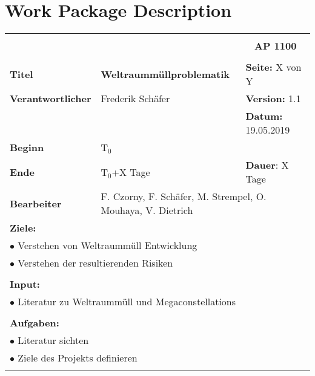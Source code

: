\section{Work Package Description}
\label{sec:wpd}


\begin{table}[!h]
 \begin{center}
  \begin{tabular}{|p{35mm}||p{55mm}|p{50mm}||p{40mm}|}
   \hline
   \multicolumn{3}{|l||}{\textbf{}} & \multicolumn{1}{c|}{}\\
   \multicolumn{3}{|l||}{\textbf{}} & \multicolumn{1}{c|}{\textbf{AP 1100}}\\
   \multicolumn{3}{|l||}{\textbf{}} & \multicolumn{1}{c|}{}\\
   \hline\hline
   \textbf{Titel} & \multicolumn{2}{p{7cm}||}{\textbf{Weltraummüllproblematik}} & \textbf{Seite:} X von Y\\
   \hline
   \textbf{Verantwortlicher} & \multicolumn{2}{l||}{Frederik Schäfer} & \textbf{Version:} 1.1\\
   \hline
   \multicolumn{3}{|l||}{} & \textbf{Datum:} 19.05.2019\\
   \hline\hline
   \textbf{Beginn} & \multicolumn{2}{l||}{T$_0$} & \\
   \hline
   \textbf{Ende} & \multicolumn{2}{l||}{T$_0$+X Tage} & \textbf{Dauer}: X Tage\\
   \hline\hline
   \textbf{Bearbeiter} & \multicolumn{3}{l|}{F. Czorny, F. Schäfer, M. Strempel, O. Mouhaya, V. Dietrich}\\
   \hline\hline
   \multicolumn{4}{|p{150mm}|}{\textbf{Ziele:}}\\
   \multicolumn{4}{|p{150mm}|}{$\bullet$ Verstehen von Weltraummüll Entwicklung}\\
   \multicolumn{4}{|p{150mm}|}{$\bullet$ Verstehen der resultierenden Risiken}\\
   \multicolumn{4}{|p{150mm}|}{}\\
   \multicolumn{4}{|p{150mm}|}{\textbf{Input:}}\\
   \multicolumn{4}{|p{150mm}|}{$\bullet$ Literatur zu Weltraummüll und Megaconstellations}\\
   \multicolumn{4}{|p{150mm}|}{}\\
   \multicolumn{4}{|p{150mm}|}{\textbf{Aufgaben:}}\\
   \multicolumn{4}{|p{150mm}|}{$\bullet$ Literatur sichten}\\
   \multicolumn{4}{|p{150mm}|}{$\bullet$ Ziele des Projekts definieren}\\
   \multicolumn{4}{|p{150mm}|}{}\\
   \hline
  \end{tabular}
 \end{center}
\end{table}

